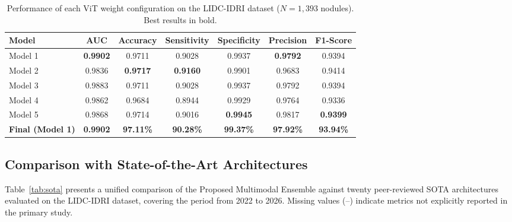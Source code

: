 \documentclass[AMA,STIX1COL]{WileyNJD-v2}
\begin{document}
\begin{table}[h]
\centering
\caption{Performance of each ViT weight configuration on the LIDC-IDRI dataset ($N=1{,}393$ nodules). Best results in bold.}\label{tab:results}
\begin{tabular}{lcccccc}
\toprule
\textbf{Model} & \textbf{AUC} & \textbf{Accuracy} & \textbf{Sensitivity} & \textbf{Specificity} & \textbf{Precision} & \textbf{F1-Score} \\
\midrule
Model 1 & \textbf{0.9902} & 0.9711 & 0.9028 & 0.9937 & \textbf{0.9792} & 0.9394 \\
Model 2 & 0.9836 & \textbf{0.9717} & \textbf{0.9160} & 0.9901 & 0.9683 & 0.9414 \\
Model 3 & 0.9883 & 0.9711 & 0.9028 & 0.9937 & 0.9792 & 0.9394 \\
Model 4 & 0.9862 & 0.9684 & 0.8944 & 0.9929 & 0.9764 & 0.9336 \\
Model 5 & 0.9868 & 0.9714 & 0.9016 & \textbf{0.9945} & 0.9817 & \textbf{0.9399} \\
\midrule
\textbf{Final (Model 1)} & \textbf{0.9902} & \textbf{97.11\%} & \textbf{90.28\%} & \textbf{99.37\%} & \textbf{97.92\%} & \textbf{93.94\%} \\
\bottomrule
\end{tabular}
\end{table}

\subsection{Comparison with State-of-the-Art Architectures}

Table~\ref{tab:sota} presents a unified comparison of the Proposed Multimodal Ensemble against twenty peer-reviewed SOTA architectures evaluated on the LIDC-IDRI dataset, covering the period from 2022 to 2026. Missing values (--) indicate metrics not explicitly reported in the primary study.
\end{document}
